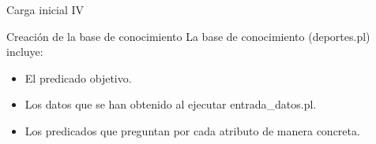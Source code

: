 \begin{frame}{Carga inicial IV}
 \begin{block}{Creación de la base de conocimiento}
La base de conocimiento (deportes.pl) incluye:
\begin{itemize}
 \item El predicado objetivo.
 \item Los datos que se han obtenido al ejecutar entrada\_datos.pl.
 \item Los predicados que preguntan por cada atributo de manera concreta.
\end{itemize}
 \end{block}
\end{frame}
